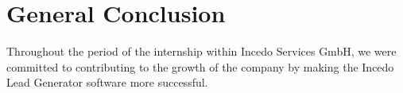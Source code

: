\thispagestyle{plain} %
\section*{General Conclusion}
Throughout the period of the internship within Incedo Services GmbH, we were committed to contributing to the growth of the company by making the Incedo Lead Generator software more successful.
